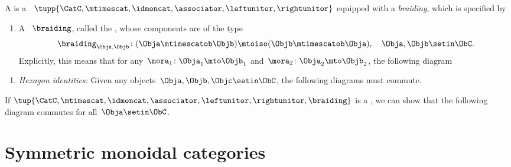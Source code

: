 

\begin{ctdefinition}
    \label{def:braided-monoidal-category}
    A  is a ~$\tupp{\CatC, \mtimescat, \idmoncat, \associator, \leftunitor, \rightunitor}$ eq\-uip\-ped with a \emph{braiding}, which is specified by

    \constit
    \begin{enumerate}
        \item A ~$\braiding$, called the , whose components are of the type \label{def:braiding}
              \begin{equation}
                  \label{eq:braiding_symmetry}
                  \braiding_{\Obja,\Objb}\colon (\Obja\mtimescatob \Objb)\mtoiso (\Objb\mtimescatob \Obja), \quad \Obja,\Objb \setin \ObC.
              \end{equation}
              Explicitly, this means that for any~$\mora_1\colon \Obja_1\mto \Objb_1$ and~$\mora_2\colon \Obja_2\mto \Objb_2$, the following diagram
    \end{enumerate}

    \condit
    \begin{enumerate}
        \item \emph{Hexagon identities:} Given any objects~$\Obja,\Objb,\Objc\setin \ObC$, the following diagrams must commute.
    \end{enumerate}
\end{ctdefinition}

\begin{remark}
    If $\tup{\CatC,\mtimescat, \idmoncat, \associator, \leftunitor, \rightunitor, \braiding}$ is a , we can show that the following diagram commutes for all~$\Obja \setin \ObC$.
\end{remark}

\section{Symmetric monoidal categories}

